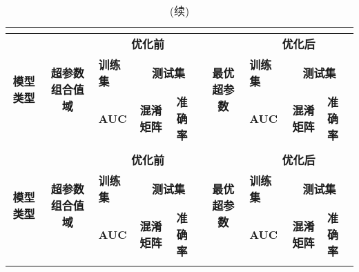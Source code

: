\begin{landscape}
      \begin{longtable}{m{3cm}<{\centering}m{5cm}<{\centering}m{1cm}<{\centering}m{2cm}<{\centering}m{1cm}<{\centering}m{3cm}<{\centering}m{1cm}<{\centering}m{2cm}<{\centering}m{1cm}<{\centering}}
            \caption{超参数优化前后模型性能对比}\\
            \label{tab:super_para}\\
            \toprule
            \multicolumn{1}{c}{\multirow{3}{*}{\textbf{模型类型}}} & \multicolumn{1}{c}{\multirow{3}{*}{\textbf{超参数组合值域}}}    & \multicolumn{3}{c}{\textbf{优化前}}   & \multicolumn{1}{c}{\multirow{3}{*}{\textbf{最优超参数}}}   & \multicolumn{3}{c}{\textbf{优化后}} \\
            \multicolumn{1}{c}{} & \multicolumn{1}{c}{}     & \textbf{训练集} & \multicolumn{2}{c}{\textbf{测试集}} & \multicolumn{1}{c}{}   & \textbf{训练集} & \multicolumn{2}{c}{\textbf{测试集}}     \\
            \multicolumn{1}{c}{} & \multicolumn{1}{c}{}     & \textbf{AUC} & \textbf{混淆矩阵}    & \textbf{准确率} & \multicolumn{1}{c}{}    & \textbf{AUC} & \multicolumn{1}{c}{\textbf{混淆矩阵}}     & \textbf{准确率} \\
            \midrule
            \endfirsthead
            \caption[]{(续)}\\
            \midrule
            \multicolumn{1}{c}{\multirow{3}{*}{\textbf{模型类型}}} & \multicolumn{1}{c}{\multirow{3}{*}{\textbf{超参数组合值域}}}    & \multicolumn{3}{c}{\textbf{优化前}}   & \multicolumn{1}{c}{\multirow{3}{*}{\textbf{最优超参数}}}   & \multicolumn{3}{c}{\textbf{优化后}} \\
            \multicolumn{1}{c}{} & \multicolumn{1}{c}{}     & \textbf{训练集} & \multicolumn{2}{c}{\textbf{测试集}} & \multicolumn{1}{c}{}   & \textbf{训练集} & \multicolumn{2}{c}{\textbf{测试集}}     \\
            \multicolumn{1}{c}{} & \multicolumn{1}{c}{}     & \textbf{AUC} & \textbf{混淆矩阵}    & \textbf{准确率} & \multicolumn{1}{c}{}    & \textbf{AUC} & \multicolumn{1}{c}{\textbf{混淆矩阵}}     & \textbf{准确率} \\
            \endhead 
            \midrule
            \endfoot
            \bottomrule
            \endlastfoot

\end{longtable}
\end{landscape}
